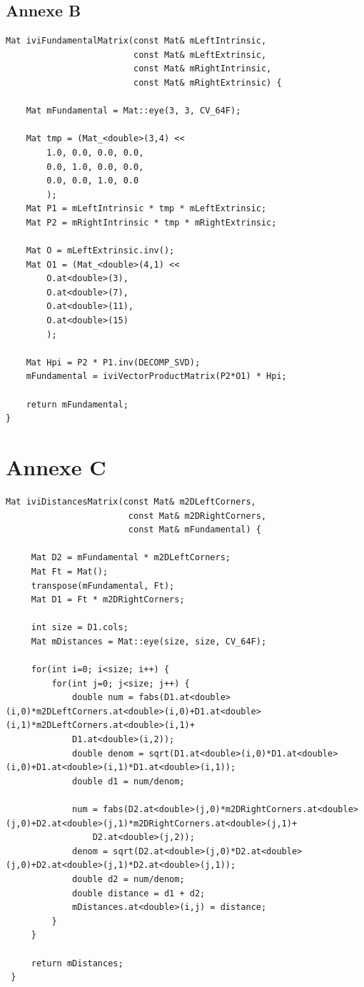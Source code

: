 \documentclass[a4paper,10pt]{article}
\begin{document}
\subsection{Annexe B}
\label{Afondamentale}
\begin{lstlisting}[caption=Calcul matrice fondamentale]
 Mat iviFundamentalMatrix(const Mat& mLeftIntrinsic,
                         const Mat& mLeftExtrinsic,
                         const Mat& mRightIntrinsic,
                         const Mat& mRightExtrinsic) {
                         
    Mat mFundamental = Mat::eye(3, 3, CV_64F);
   
    Mat tmp = (Mat_<double>(3,4) <<
        1.0, 0.0, 0.0, 0.0,
        0.0, 1.0, 0.0, 0.0,
        0.0, 0.0, 1.0, 0.0
        );
    Mat P1 = mLeftIntrinsic * tmp * mLeftExtrinsic;
    Mat P2 = mRightIntrinsic * tmp * mRightExtrinsic;

    Mat O = mLeftExtrinsic.inv();
    Mat O1 = (Mat_<double>(4,1) <<
        O.at<double>(3),
        O.at<double>(7),
        O.at<double>(11),
        O.at<double>(15)
        );

    Mat Hpi = P2 * P1.inv(DECOMP_SVD);
    mFundamental = iviVectorProductMatrix(P2*O1) * Hpi;

    return mFundamental;
}
\end{lstlisting}

\section{Annexe C}
\label{distanceA}
\begin{lstlisting}[caption=Calcul des distances entre les points de chaque paire]
 Mat iviDistancesMatrix(const Mat& m2DLeftCorners,
                        const Mat& m2DRightCorners,
                        const Mat& mFundamental) {
     
     Mat D2 = mFundamental * m2DLeftCorners;
     Mat Ft = Mat();
     transpose(mFundamental, Ft);
     Mat D1 = Ft * m2DRightCorners;
 
     int size = D1.cols;
     Mat mDistances = Mat::eye(size, size, CV_64F);
 
     for(int i=0; i<size; i++) {
         for(int j=0; j<size; j++) {
             double num = fabs(D1.at<double>(i,0)*m2DLeftCorners.at<double>(i,0)+D1.at<double>(i,1)*m2DLeftCorners.at<double>(i,1)+
             D1.at<double>(i,2));
             double denom = sqrt(D1.at<double>(i,0)*D1.at<double>(i,0)+D1.at<double>(i,1)*D1.at<double>(i,1));
             double d1 = num/denom;
 
             num = fabs(D2.at<double>(j,0)*m2DRightCorners.at<double>(j,0)+D2.at<double>(j,1)*m2DRightCorners.at<double>(j,1)+
                 D2.at<double>(j,2));
             denom = sqrt(D2.at<double>(j,0)*D2.at<double>(j,0)+D2.at<double>(j,1)*D2.at<double>(j,1));
             double d2 = num/denom;
             double distance = d1 + d2;
             mDistances.at<double>(i,j) = distance;
         }
     }
 
     return mDistances;
 }
\end{lstlisting}
\end{document}
